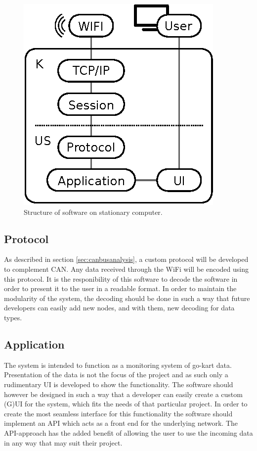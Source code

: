 \begin{figure}[h]
	\centering
	\includegraphics{graphics/stationary_software.eps}
	\caption{Structure of software on stationary computer.}
	\label{fig:setup_ui}
\end{figure}

\subsection{Protocol}
As described in section \ref{sec:canbusanalysis}, a custom protocol will be developed to complement CAN.
Any data received through the WiFi will be encoded using this protocol.
It is the responibility of this software to decode the software in order to present it to the user in a readable format.
In order to maintain the modularity of the system, the decoding should be done in such a way that future developers can easily add new nodes, and with them, new decoding for data types.

\subsection{Application}
The system is intended to function as a monitoring system of go-kart data.
Presentation of the data is not the focus of the project and as such only a rudimentary UI is developed to show the functionality.
The software should however be designed in such a way that a developer can easily create a custom (G)UI for the system, which fits the needs of that particular project.
In order to create the most seamless interface for this functionality the software should implement an API which acts as a front end for the underlying network.
The API-approach has the added benefit of allowing the user to use the incoming data in any way that may suit their project.
